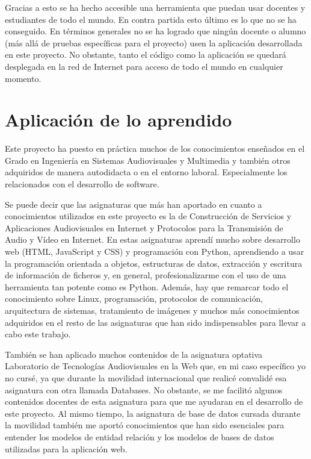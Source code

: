 \documentclass[a4paper, 12pt]{book}
\begin{document}
Gracias a esto se ha hecho accesible una herramienta que puedan usar docentes y estudiantes de todo el mundo. En contra partida esto último es lo que no se ha conseguido. En términos generales no se ha logrado que ningún docente o alumno (más allá de pruebas específicas para el proyecto) usen la aplicación desarrollada en este proyecto. No obstante, tanto el código como la aplicación se quedará desplegada en la red de Internet para acceso de todo el mundo en cualquier momento. 


\section{Aplicación de lo aprendido}
\label{sec:aplicacion}

Este proyecto ha puesto en práctica muchos de los conocimientos enseñados en el Grado en Ingeniería en Sistemas Audiovisuales y Multimedia y también otros adquiridos de manera autodidacta o en el entorno laboral. Especialmente los relacionados con el desarrollo de software.

Se puede decir que las asignaturas que más han aportado en cuanto a conocimientos utilizados en este proyecto es la de Construcción de Servicios y Aplicaciones Audiovisuales en Internet y Protocolos para la Transmisión de Audio y Vídeo en Internet. En estas asignaturas aprendí mucho sobre desarrollo web (HTML, JavaScript y CSS) y programación con Python, aprendiendo a usar la programación orientada a objetos, estructuras de datos, extracción y escritura de información de ficheros y, en general, profesionalizarme con el uso de una herramienta tan potente como es Python. Además, hay que remarcar todo el conocimiento sobre Linux, programación, protocolos de comunicación, arquitectura de sistemas, tratamiento de imágenes y muchos más conocimientos adquiridos en el resto de las asignaturas que han sido indispensables para llevar a cabo este trabajo.

También se han aplicado muchos contenidos de la asignatura optativa Laboratorio de Tecnologías Audiovisuales en la Web que, en mi caso específico yo no cursé, ya que durante la movilidad internacional que realicé convalidé esa asignatura con otra llamada Databases. No obstante, se me facilitó algunos contenidos docentes de esta asignatura para que me ayudaran en el desarrollo de este proyecto. Al mismo tiempo, la asignatura de base de datos cursada durante la movilidad también me aportó conocimientos que han sido esenciales para entender los modelos de entidad relación y los modelos de bases de datos utilizadas para la aplicación web.
\end{document}
